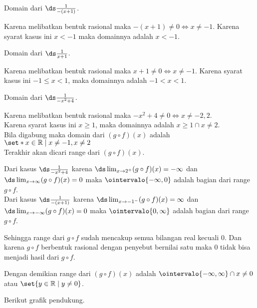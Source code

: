 \begin{enumerate}[leftmargin=*, label={\arabic*}.]
\begin{enumerate}[label={\alph*}.]
Domain dari $\ds \frac{1}{-(x+1)}$.

Karena melibatkan bentuk rasional maka $-(x+1) \neq 0 \iff x \neq -1$. Karena 
syarat kasus ini $x < -1$ maka domainnya adalah $x < -1$.

Domain dari $\ds \frac{1}{x+1}$.

Karena melibatkan bentuk rasional maka $x+1 \neq 0 \iff x \neq -1$. Karena 
syarat kasus ini $-1 \leq x < 1$, maka domainnya adalah $-1 < x < 1$.

Domain dari $\ds \frac{1}{-x^{2}+4}$.

Karena melibatkan bentuk rasional maka $-x^{2}+4 \neq 0 \iff x \neq -2,2$.\\
Karena syarat kasus ini $x \geq 1$, maka domainnya adalah $x \geq 1 \cap x \neq 2$.\\
Bila digabung maka domain dari $(g \circ f)(x)$ adalah 
$\set*{x \in \mathbb{R} \mid x \neq -1, x\neq 2}$ \\

Terakhir akan dicari range dari $(g \circ f)(x)$.

Dari kasus $\ds \frac{1}{-x^{2}+4}$ 
karena $\ds \lim_{x\to 2^{+}} (g \circ f)(x) = -\infty$ dan 
$\ds \lim_{x\to \infty} (g \circ f)(x) = 0$ maka 
$\ointervalo{-\infty,0}$ adalah bagian dari range $g \circ f$.\\
Dari kasus $\ds \frac{1}{-(x+1)}$ 
karena $\ds \lim_{x\to -1^{-}} (g \circ f)(x) = \infty$ dan 
$\ds \lim_{x\to -\infty} (g \circ f)(x) = 0$ maka 
$\ointervalo{0,\infty}$ adalah bagian dari range $g \circ f$.

Sehingga range dari $g \circ f$ sudah mencakup semua bilangan real kecuali $0$.
Dan karena $g \circ f$ berbentuk rasional dengan penyebut bernilai satu maka $0$ 
tidak bisa menjadi hasil dari $g \circ f$.

Dengan demikian range dari $(g \circ f)(x)$ adalah $\ointervalo{-\infty,\infty} \cap x \neq 0$ 
atau $\set{y \in \mathbb{R} \mid y \neq 0}$.

Berikut grafik pendukung.

\begin{center}
\end{center}


\end{enumerate}
\end{enumerate}
